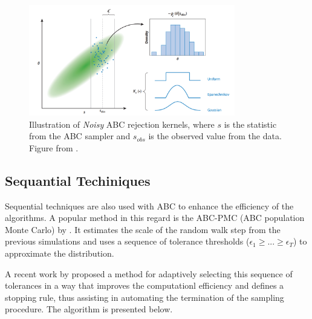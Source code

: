 \documentclass[runningheads]{llncs}
\begin{document}
    \begin{figure}[H]
        \centering
        \includegraphics[width=9cm]{images/NoisyABC.png}
        \caption{
        Illustration of \textit{Noisy} ABC rejection kernels, where
        $s$ is the statistic from the ABC sampler and $s_{obs}$ is 
        the observed value from the data.
        Figure from \cite{Beaumont2018}.
        \label{fig:noisyabc}
        }
    \end{figure}

\subsection{Sequantial Techiniques}
\label{subsec:statistical-summaries}

Sequential techniques are also used with ABC to enhance the
efficiency of the algorithms. A popular method in this regard is
the ABC-PMC
(ABC population Monte Carlo) by \citet{Beaumont2009}.
It estimates the scale of the random walk step from the previous
simulations and
uses a sequence of tolerance thresholds
($\epsilon_1 \geq ... \geq \epsilon_T$) to approximate the distribution.

 A recent work by \citet{Simola2019} proposed a method
 for adaptively selecting this sequence of tolerances in a way that
 improves the computationl efficiency and defines a stopping rule,
 thus assisting in automating the termination of the sampling
 procedure. The algorithm is presented below.


\hfill\break
\end{document}
